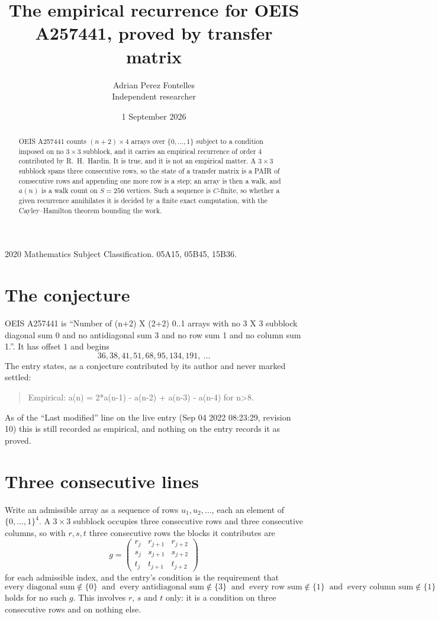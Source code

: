 \documentclass[11pt,a4paper]{article}
\title{The empirical recurrence for OEIS A257441, proved by transfer matrix}
\author{Adrian Perez Fontelles\\ \small Independent researcher}
\date{1 September 2026}
\theoremstyle{plain}
\theoremstyle{definition}
\begin{document}
\maketitle

\begin{abstract}
OEIS A257441 counts $(n+2)\times4$ arrays over $\{0,\dots,1\}$ subject to a condition imposed on
no $3\times3$ subblock, and it carries an empirical recurrence of order $4$
contributed by R.~H.~Hardin. It is true, and it is not an empirical matter. A $3\times3$
subblock spans three consecutive rows, so the state of a transfer matrix is a PAIR of
consecutive rows and appending one more row is a step; an array is then a walk, and
$a(n)$ is a walk count on $S=256$ vertices. Such a sequence is $C$-finite, so whether a given
recurrence annihilates it is decided by a finite exact computation, with the Cayley--Hamilton
theorem bounding the work.
\end{abstract}

\noindent\small 2020 Mathematics Subject Classification. 05A15, 05B45, 15B36.\normalsize

\section{The conjecture}

OEIS A257441 is ``Number of (n+2) X (2+2) 0..1 arrays with no 3 X 3 subblock diagonal sum 0 and no antidiagonal sum 3 and no row sum 1 and no column sum 1.''. It has offset $1$ and begins
\[
36, 38, 41, 51, 68, 95, 134, 191,\ \dots
\]
The entry states, as a conjecture contributed by its author and never marked settled:
\begin{quote}
Empirical: a(n) = 2*a(n-1) - a(n-2) + a(n-3) - a(n-4) for n>8.
\end{quote}
As of the ``Last modified'' line on the live entry (Sep 04 2022 08:23:29, revision 10) this is still
recorded as empirical, and nothing on the entry records it as proved.

\section{Three consecutive lines}

Write an admissible array as a sequence of rows $u_1,u_2,\dots$, each an element of
$\{0,\dots,1\}^{4}$. A $3\times3$ subblock occupies three consecutive rows and
three consecutive columns, so with $r,s,t$ three consecutive rows the blocks it
contributes are
\[
g=\begin{pmatrix}r_j&r_{j+1}&r_{j+2}\\ s_j&s_{j+1}&s_{j+2}\\ t_j&t_{j+1}&t_{j+2}\end{pmatrix}
\]
for each admissible index, and the entry's condition is the requirement that
\[
\text{every diagonal sum} \notin \{0\}\ \text{ and }\ \text{every antidiagonal sum} \notin \{3\}\ \text{ and }\ \text{every row sum} \notin \{1\}\ \text{ and }\ \text{every column sum} \notin \{1\}
\]
holds for no such $g$. This involves $r$, $s$ and $t$ only: it is a condition on
three consecutive rows and on nothing else.
\end{document}
